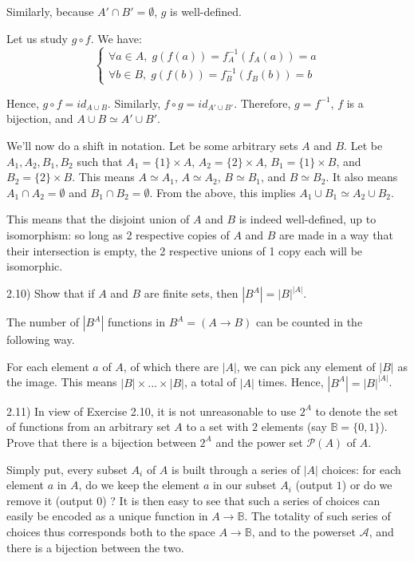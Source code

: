Similarly, because $A' \cap B' = \emptyset$, $g$ is well-defined.

Let us study $g \circ f$. We have:
$$
\begin{cases}
	\forall a \in A, \; g(f(a)) = f_A^{-1}(f_A(a)) = a \\
	\forall b \in B, \; g(f(b)) = f_B^{-1}(f_B(b)) = b
\end{cases}
$$

Hence, $g \circ f = id_{A \cup B}$.
Similarly, $f \circ g = id_{A' \cup B'}$.
Therefore, $g = f^{-1}$, $f$ is a bijection, and $A \cup B \simeq A' \cup B'$.

We'll now do a shift in notation. Let be some arbitrary sets $A$ and $B$. Let be $A_1, A_2, B_1, B_2$ such that $A_1 = \{ 1 \} \times A$, $A_2 = \{ 2 \} \times A$, $B_1 = \{ 1 \} \times B$, and $B_2 = \{ 2 \} \times B$. This means $A \simeq A_1$, $A \simeq A_2$, $B \simeq B_1$, and $B \simeq B_2$. It also means $A_1 \cap A_2 = \emptyset$ and $B_1 \cap B_2 = \emptyset$. From the above, this implies $A_1 \cup B_1 \simeq A_2 \cup B_2$.

This means that the disjoint union of $A$ and $B$ is indeed well-defined, up to isomorphism: so long as 2 respective copies of $A$ and $B$ are made in a way that their intersection is empty, the 2 respective unions of 1 copy each will be isomorphic.



2.10) Show that if $A$ and $B$ are ﬁnite sets, then $|B^A| = |B|^{|A|}$.

The number of $|B^A|$ functions in $B^A = (A \to B)$ can be counted in the following way.

For each element $a$ of $A$, of which there are $|A|$, we can pick any element of $|B|$ as the image. This means $|B| \times ... \times |B|$, a total of $|A|$ times. Hence, $|B^A| = |B|^{|A|}$.



2.11) In view of Exercise 2.10, it is not unreasonable to use $2^A$ to denote the set of functions from an arbitrary set $A$ to a set with $2$ elements (say $\mathbb{B} = \{0, 1\}$). Prove that there is a bijection between $2^A$ and the power set $\mathcal{P}(A)$ of $A$.

Simply put, every subset $A_i$ of $A$ is built through a series of $|A|$ choices: for each element $a$ in $A$, do we keep the element $a$ in our subset $A_i$ (output $1$) or do we remove it (output $0$) ? It is then easy to see that such a series of choices can easily be encoded as a unique function in $A \to \mathbb{B}$. The totality of such series of choices thus corresponds both to the space $A \to \mathbb{B}$, and to the powerset $\mathcal{A}$, and there is a bijection between the two. 





